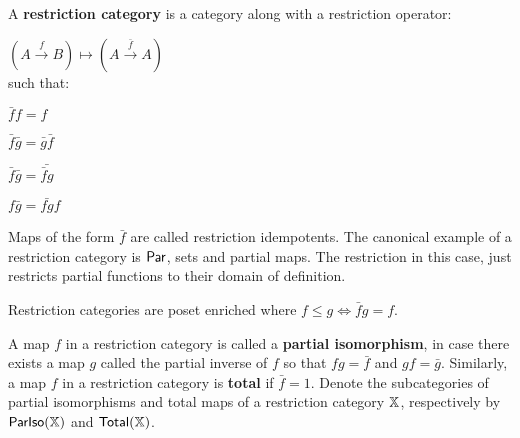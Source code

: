\begin{definition}\cite[\S 2.1.1]{cockett}
A {\bf restriction category} is a category along with a restriction operator:

\hfil
$
(A \xrightarrow{f} B )\mapsto (A \xrightarrow{\bar f} A)
$\\
such that:


\begin{center}
\begin{multicols}{4}
\begin{enumerate}[label={\bf [R.\arabic*]}, ref={\bf [R.\arabic*]}]
\item $\bar f f  = f$
\label{R.1}
\item $\bar f \bar g = \bar g \bar f$
\label{R.2}
\item $\bar f \bar g = \bar{\bar f g}$
\label{R.3}
\item $f \bar g = \bar{fg} f$
\label{R.4}
\end{enumerate}
\end{multicols}
\end{center}


Maps of the form $\bar f$ are called restriction idempotents.
The canonical example of a restriction category is $\mathsf{Par}$, sets and partial maps.  The restriction in this case, just restricts partial functions to their domain of definition.


Restriction categories are poset enriched where $f \leq g \iff \bar f g = f$.


A map $f$ in a restriction category is called a {\bf partial isomorphism}, in case there exists a map $g$ called the partial inverse of $f$ so that $fg=\bar f$ and $gf = \bar g$.  Similarly, a map $f$ in a restriction category is {\bf total} if $\bar f =1$.  Denote the subcategories of partial isomorphisms and total maps of a restriction category $\mathbb{X}$, respectively by $\mathsf{ParIso}(\mathbb{X})$ and $\mathsf{Total}(\mathbb{X})$.



\end{definition}



